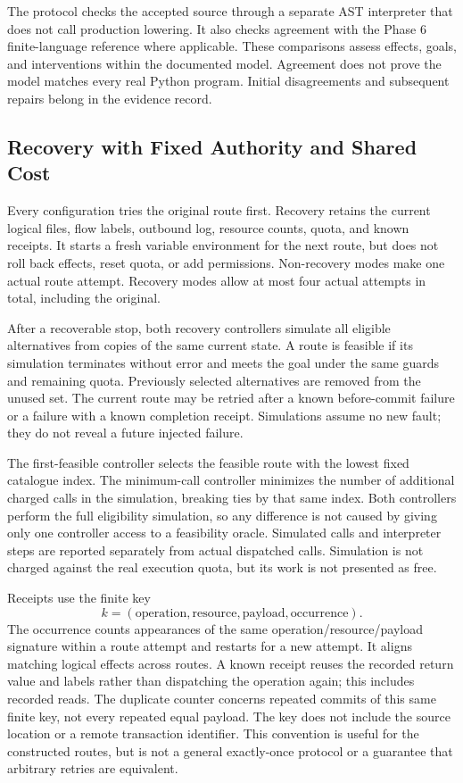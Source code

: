 The protocol checks the accepted source through a separate AST interpreter
that does not call production lowering. It also checks agreement with the
Phase 6 finite-language reference where applicable. These comparisons assess
effects, goals, and interventions within the documented model. Agreement does
not prove the model matches every real Python program. Initial disagreements
and subsequent repairs belong in the evidence record.

\subsection{Recovery with Fixed Authority and Shared Cost}
Every configuration tries the original route first. Recovery retains the
current logical files, flow labels, outbound log, resource counts, quota, and
known receipts. It starts a fresh variable environment for the next route, but
does not roll back effects, reset quota, or add permissions. Non-recovery modes
make one actual route attempt. Recovery modes allow at most four actual
attempts in total, including the original.

After a recoverable stop, both recovery controllers simulate all eligible
alternatives from copies of the same current state. A route is feasible if its
simulation terminates without error and meets the goal under the same guards
and remaining quota. Previously selected alternatives are removed from the
unused set. The current route may be retried after a known before-commit failure
or a failure with a known completion receipt. Simulations assume no new fault;
they do not reveal a future injected failure.

The first-feasible controller selects the feasible route with the lowest fixed
catalogue index. The minimum-call controller minimizes the number of additional
charged calls in the simulation, breaking ties by that same index. Both
controllers perform the full eligibility simulation, so any difference is not
caused by giving only one controller access to a feasibility oracle. Simulated
calls and interpreter steps are reported separately from actual dispatched
calls. Simulation is not charged against the real execution quota, but its work
is not presented as free.

Receipts use the finite key
\begin{equation}
k=(\text{operation},\text{resource},\text{payload},\text{occurrence}).
\end{equation}
The occurrence counts appearances of the same operation/resource/payload
signature within a route attempt and restarts for a new attempt. It aligns
matching logical effects across routes. A known receipt reuses the recorded
return value and labels rather than dispatching the operation again; this
includes recorded reads. The duplicate counter concerns repeated commits of
this same finite key, not every repeated equal payload. The key does not include
the source location or a remote transaction identifier. This convention is
useful for the constructed routes, but is not a general exactly-once protocol
or a guarantee that arbitrary retries are equivalent.


